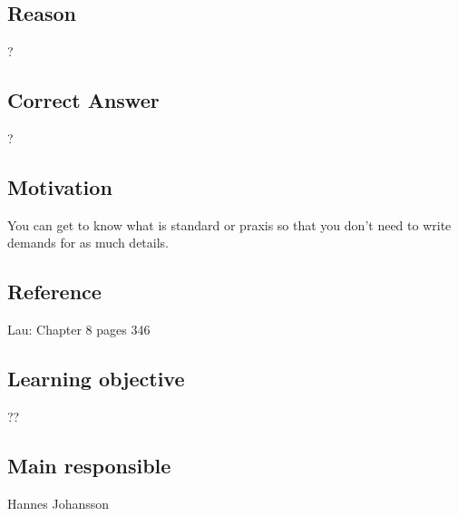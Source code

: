 \documentclass[a4paper]{article}
\begin{document}
\subsection{Reason}
?
\subsection{Correct Answer}
?
\subsection{Motivation}
You can get to know what is standard or praxis so that you don't need to write demands for as much details.
\subsection{Reference}
Lau: Chapter 8 pages 346
\subsection{Learning objective}
??
\subsection{Main responsible}
Hannes Johansson
\end{document}
